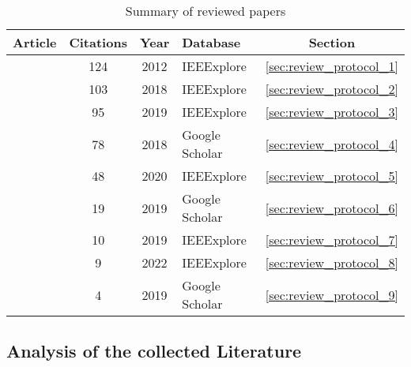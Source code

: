 \begin{table}[H]
    \centering
    \caption{Summary of reviewed papers}
    \label{tbl:review_summary}
    \begin{tabular}{|l|c|c|l|c|}
        \hline
        \textbf{Article}                                         & \textbf{Citations} & \textbf{Year} & \textbf{Database} & \textbf{Section}            \\
        \hline\hline
        \citeauthor*{Majzoobi2012} \cite{Majzoobi2012}           & 124                & 2012          & IEEExplore        & \ref{sec:review_protocol_1} \\
        \hline\citeauthor*{Gope2018} \cite{Gope2018}             & 103                & 2018          & IEEExplore        & \ref{sec:review_protocol_2} \\
        \hline\citeauthor*{Chatterjee2019} \cite{Chatterjee2019} & 95                 & 2019          & IEEExplore        & \ref{sec:review_protocol_3} \\
        \hline\citeauthor*{Braeken2018} \cite{Braeken2018}       & 78                 & 2018          & Google Scholar    & \ref{sec:review_protocol_4} \\
        \hline\citeauthor*{Bansal2020} \cite{Bansal2020}         & 48                 & 2020          & IEEExplore        & \ref{sec:review_protocol_5} \\
        \hline\citeauthor*{Zhu2019} \cite{Zhu2019}               & 19                 & 2019          & Google Scholar    & \ref{sec:review_protocol_6} \\
        \hline\citeauthor*{Jiang2019} \cite{Jiang2019}           & 10                 & 2019          & IEEExplore        & \ref{sec:review_protocol_7} \\
        \hline\citeauthor*{Gope2022} \cite{Gope2022}             & 9                  & 2022          & IEEExplore        & \ref{sec:review_protocol_8} \\
        \hline\citeauthor*{Hristea2019} \cite{Hristea2019}       & 4                  & 2019          & Google Scholar    & \ref{sec:review_protocol_9} \\
        \hline
    \end{tabular}
\end{table}

\subsection{Analysis of the collected Literature}
\label{sec:review_analysis}

